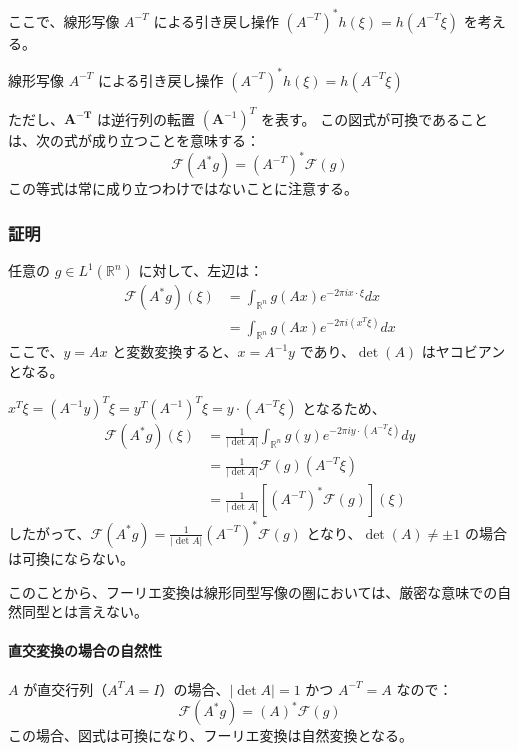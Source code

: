 \documentclass[uplatex,a4j,12pt,dvipdfmx]{jsarticle}
\begin{document}
ここで、線形写像 $A^{-T}$ による引き戻し操作 $(A^{-T})^*h(\xi) = h(A^{-T}\xi)$ を考える。

線形写像 $A^{-T}$ による引き戻し操作 $(A^{-T})^*h(\xi) = h(A^{-T}\xi)$

ただし、$\boldsymbol{A^{-T}}$ は逆行列の転置 $(\boldsymbol{A}^{-1})^{T}$ を表す。
この図式が可換であることは、次の式が成り立つことを意味する：
\[
	\mathcal{F}(A^*g) = (A^{-T})^*\mathcal{F}(g)
\]
この等式は常に成り立つわけではないことに注意する。

\subsubsection{証明}

任意の $g \in L^1(\mathbb{R}^n)$ に対して、左辺は：
\begin{align*}
	\mathcal{F}(A^* g)(\xi) & = \int_{\mathbb{R}^n} g(Ax) e^{-2\pi i x \cdot \xi} dx \\
	                        & = \int_{\mathbb{R}^n} g(Ax) e^{-2\pi i (x^T \xi)} dx
\end{align*}
ここで、$y = Ax$ と変数変換すると、$x = A^{-1}y$ であり、$\det(A)$ はヤコビアンとなる。

$x^T \xi = (A^{-1}y)^T \xi = y^T (A^{-1})^T \xi = y \cdot (A^{-T}\xi)$ となるため、
\begin{align*}
	\mathcal{F}(A^* g)(\xi) & = \frac{1}{|\det A|} \int_{\mathbb{R}^n} g(y) e^{-2\pi i y \cdot (A^{-T}\xi)} dy \\
	                        & = \frac{1}{|\det A|} \mathcal{F}(g)(A^{-T}\xi)                                   \\
	                        & = \frac{1}{|\det A|} \left[(A^{-T})^*\mathcal{F}(g)\right](\xi)
\end{align*}
したがって、$\mathcal{F}(A^*g) = \frac{1}{|\det A|}(A^{-T})^*\mathcal{F}(g)$ となり、$\det(A) \neq \pm 1$ の場合は可換にならない。

このことから、フーリエ変換は線形同型写像の圏においては、厳密な意味での自然同型とは言えない。


\paragraph{直交変換の場合の自然性}
$A$ が直交行列（$A^T A = I$）の場合、$|\det A| = 1$ かつ $A^{-T} = A$ なので：
\[
	\mathcal{F}(A^*g) = (A)^*\mathcal{F}(g)
\]
この場合、図式は可換になり、フーリエ変換は自然変換となる。
\end{document}
